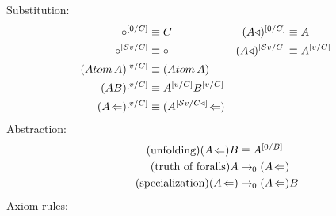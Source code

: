 \documentclass{article}
\begin{document}
  Substitution:
  \begin{align*}
    \circ^{[{0}{/}{C}]} &\equiv C & (A\triangleleft)^{[{0}{/}{C}]} &\equiv A\\
    \circ^{[{\mathcal{S}{v}}{/}{C}]} &\equiv \circ & (A\triangleleft)^{[{\mathcal{S}{v}}{/}{C}]} &\equiv A^{[{v}{/}{C}]}\\
    (Atom\,A)^{[{v}{/}{C}]} &\equiv (Atom\,A)\\
    (AB)^{[{v}{/}{C}]} &\equiv A^{[{v}{/}{C}]}B^{[{v}{/}{C}]}\\
    (A\!\Leftarrow)^{[{v}{/}{C}]} &\equiv (A^{[{\mathcal{S}{v}}{/}{C\triangleleft}]}\!\Leftarrow)\\
  \end{align*}
  Abstraction:
  \begin{align*}
    \tag{unfolding}
    (A\!\Leftarrow)B &\equiv A^{[{0}{/}{B}]}\\
    \tag{truth of foralls}
    A &\rightarrow_{\hspace{-0.04em}0} (A\!\Leftarrow)\\
    \tag{specialization}
    (A\!\Leftarrow) &\rightarrow_{\hspace{-0.04em}0} (A\!\Leftarrow)B\\
  \end{align*}
  Axiom rules:
  \setlength{\jot}{1.4em}
\end{document}
